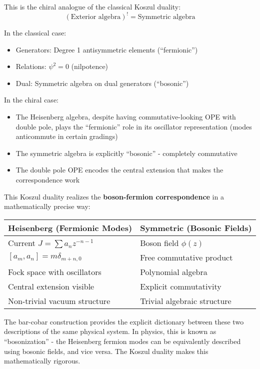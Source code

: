 \begin{remark}
This is the chiral analogue of the classical Koszul duality:
$$(\text{Exterior algebra})^! = \text{Symmetric algebra}$$

In the classical case:
\begin{itemize}
\item Generators: Degree 1 antisymmetric elements (``fermionic'')
\item Relations: $\psi^2 = 0$ (nilpotence)
\item Dual: Symmetric algebra on dual generators (``bosonic'')
\end{itemize}

In the chiral case:
\begin{itemize}
\item The Heisenberg algebra, despite having commutative-looking OPE with double pole, plays the ``fermionic'' role in its oscillator representation (modes anticommute in certain gradings)
\item The symmetric algebra is explicitly ``bosonic'' - completely commutative
\item The double pole OPE encodes the central extension that makes the correspondence work
\end{itemize}
\end{remark}

\begin{remark}
This Koszul duality realizes the \textbf{boson-fermion correspondence} in a mathematically precise way:

\begin{center}
\begin{tabular}{|l|l|}
\hline
\textbf{Heisenberg (Fermionic Modes)} & \textbf{Symmetric (Bosonic Fields)} \\
\hline
Current $J = \sum a_n z^{-n-1}$ & Boson field $\phi(z)$ \\
$[a_m, a_n] = m\delta_{m+n,0}$ & Free commutative product \\
Fock space with oscillators & Polynomial algebra \\
Central extension visible & Explicit commutativity \\
Non-trivial vacuum structure & Trivial algebraic structure \\
\hline
\end{tabular}
\end{center}

The bar-cobar construction provides the explicit dictionary between these two descriptions of the same physical system. In physics, this is known as ``bosonization'' - the Heisenberg fermion modes can be equivalently described using bosonic fields, and vice versa. The Koszul duality makes this mathematically rigorous.
\end{remark}

